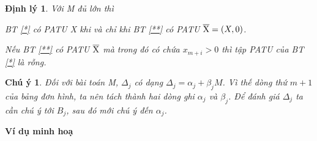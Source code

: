 \documentclass{article}
\newtheorem{dl}{Định lý}
\newtheorem{cy}{Chú ý}
\begin{document}
\begin{enumerate}
\begin{dl}
                                Với M đủ lớn thì
                                \item BT \eqref{*}  có PATU X khi và chỉ khi BT \eqref{**} có PATU $\overline{\rm X} = (X,0)$.
                                \item Nếu BT \eqref{**} có PATU $\overline{\rm X}$ mà trong đó có chứa $x_{m+i}>0$ thì tập PATU của BT \eqref{*} là rỗng.
                            \end{dl}
                            \begin{cy}
                                Đối với bài toán M, $\Delta_j$ có dạng $\Delta_j=\alpha_j+\beta_jM$. Vì thế dòng thứ $m+1$ của bảng đơn hình, ta nên tách thành hai dòng ghi $\alpha _j$ và $\beta_j$. Để đánh giá $\Delta_j$ ta cần chú ý tới $B_j$, sau đó mới chú ý đến $\alpha_j$.
                            \end{cy} 
                    \item \textbf{Ví dụ minh hoạ} \\          
                \end{enumerate}
\end{document}
